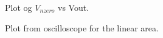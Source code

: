 \documentclass[a4paper,english,11pt]{article}
\begin{document}
\begin{figure}[!htbp]
 \centering
  \caption{Plot og $V_{nzero}$ vs Vout.}
  \label{fig:vnzero:vout}	
\end{figure}
\begin{figure}[!htbp]
 \centering
  \caption{Plot from oscilloscope for the linear area.}
  \label{fig:scope:plot:lin}	
\end{figure}
\end{document}

